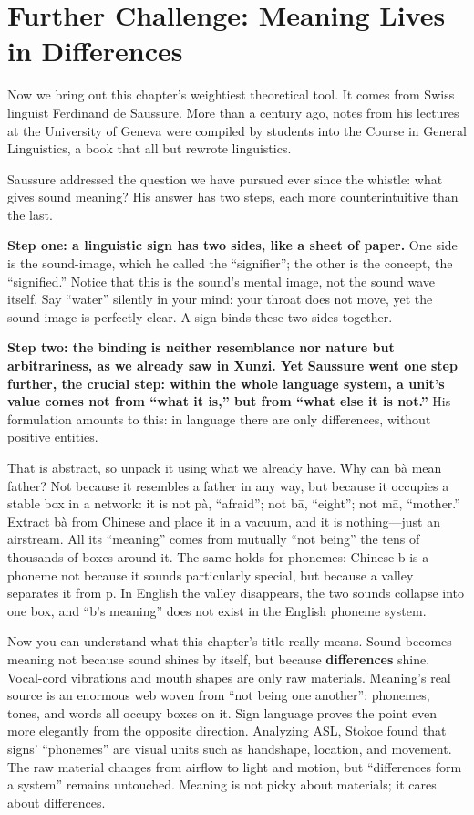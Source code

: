 \section{Further Challenge: Meaning Lives in Differences}
Now we bring out this chapter's weightiest theoretical tool. It comes from Swiss linguist Ferdinand de Saussure. More than a century ago, notes from his lectures at the University of Geneva were compiled by students into the Course in General Linguistics, a book that all but rewrote linguistics.

Saussure addressed the question we have pursued ever since the whistle: what gives sound meaning? His answer has two steps, each more counterintuitive than the last.

\textbf{Step one: a linguistic sign has two sides, like a sheet of paper.} One side is the sound-image, which he called the ``signifier''; the other is the concept, the ``signified.'' Notice that this is the sound's mental image, not the sound wave itself. Say ``water'' silently in your mind: your throat does not move, yet the sound-image is perfectly clear. A sign binds these two sides together.

\textbf{Step two: the binding is neither resemblance nor nature but arbitrariness, as we already saw in Xunzi. Yet Saussure went one step further, the crucial step: within the whole language system, a unit's value comes not from ``what it is,'' but from ``what else it is not.''} His formulation amounts to this: in language there are only differences, without positive entities.

That is abstract, so unpack it using what we already have. Why can bà mean father? Not because it resembles a father in any way, but because it occupies a stable box in a network: it is not pà, ``afraid''; not bā, ``eight''; not mā, ``mother.'' Extract bà from Chinese and place it in a vacuum, and it is nothing---just an airstream. All its ``meaning'' comes from mutually ``not being'' the tens of thousands of boxes around it. The same holds for phonemes: Chinese b is a phoneme not because it sounds particularly special, but because a valley separates it from p. In English the valley disappears, the two sounds collapse into one box, and ``b's meaning'' does not exist in the English phoneme system.

Now you can understand what this chapter's title really means. Sound becomes meaning not because sound shines by itself, but because \textbf{differences} shine. Vocal-cord vibrations and mouth shapes are only raw materials. Meaning's real source is an enormous web woven from ``not being one another'': phonemes, tones, and words all occupy boxes on it. Sign language proves the point even more elegantly from the opposite direction. Analyzing ASL, Stokoe found that signs' ``phonemes'' are visual units such as handshape, location, and movement. The raw material changes from airflow to light and motion, but ``differences form a system'' remains untouched. Meaning is not picky about materials; it cares about differences.

